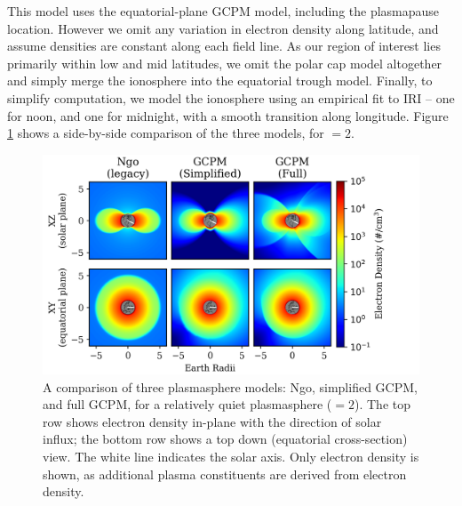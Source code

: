 This model uses the equatorial-plane GCPM model, including the plasmapause location. However we omit any variation in electron density along latitude, and assume densities are constant along each field line. As our region of interest lies primarily within low and mid latitudes, we omit the polar cap model altogether and simply merge the ionosphere into the equatorial trough model. Finally, to simplify computation, we model the ionosphere using an empirical fit to IRI -- one for noon, and one for midnight, with a smooth transition along longitude. Figure \ref{fig:plasma_model_comparison} shows a side-by-side comparison of the three models, for \kp{}$=2$.
\begin{figure}[h]
\begin{center}
\includegraphics{figures/plasma_model_comparison_serif.png}
\caption[A Comparison of three plasmasphere electron density models]{A comparison of three plasmasphere models: Ngo, simplified GCPM, and full GCPM, for a relatively quiet plasmasphere (\kp{}$=2$). The top row shows electron density in-plane with the direction of solar influx; the bottom row shows a top down (equatorial cross-section) view. The white line indicates the solar axis. Only electron density is shown, as additional plasma constituents are derived from electron density.}
\label{fig:plasma_model_comparison}
\end{center}
\end{figure}


